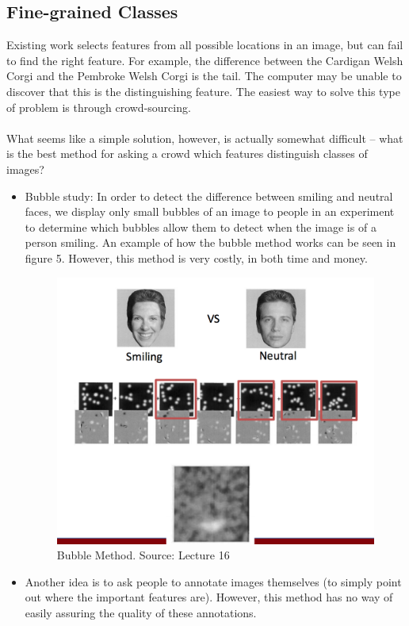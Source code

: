 \documentclass[11pt]{article}
\begin{document}
\subsection{Fine-grained Classes}
Existing work selects features from all possible locations in an image, but can fail to find the right feature. For example, the difference between the Cardigan Welsh Corgi and the Pembroke Welsh Corgi is the tail. The computer may be unable to discover that this is the distinguishing feature. The easiest way to solve this type of problem is through crowd-sourcing. \\ \\
What seems like a simple solution, however, is actually somewhat difficult -- what is the best method for asking a crowd which features distinguish classes of images?
\begin{itemize}
	\item Bubble study: In order to detect the difference between smiling and neutral faces, we display only small bubbles of an image to people in an experiment to determine which bubbles allow them to detect when the image is of a person smiling. An example of how the bubble method works can be seen in figure 5. However, this method is very costly, in both time and money.
\begin{figure}[h]
  \centering
  \includegraphics[scale=0.6]{bubblestudy.png}
  \caption{Bubble Method. Source: Lecture 16}
\end{figure}
\item Another idea is to ask people to annotate images themselves (to simply point out where the important features are). However, this method has no way of easily assuring the quality of these annotations.

\end{itemize}
\end{document}
